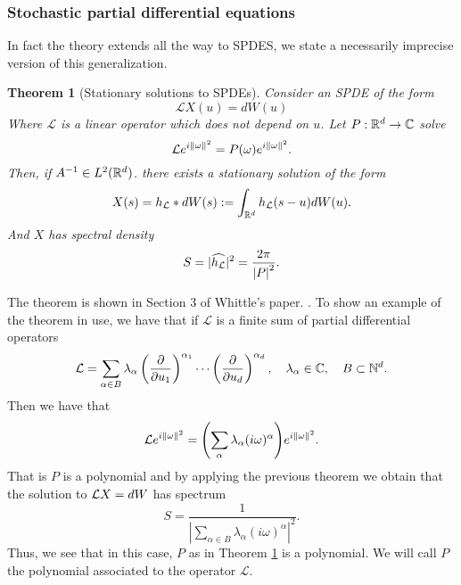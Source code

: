 \documentclass[12pt]{article}
\newtheorem{theorem}{Theorem}
\begin{document}
\subsubsection{Stochastic partial differential equations}
In fact the theory extends all the way to SPDES, we state a necessarily imprecise version of this generalization.
\begin{theorem}[Stationary solutions to SPDEs]\label{spde theorem}
	Consider an  SPDE of the form
	\begin{equation}\label{spde}
		\mathcal{L}X(u)=dW(u)
	\end{equation}
	Where $\mathcal{L}$ is a linear operator which does not depend on $u$. Let $P:{\mathbb R}^d\to\mathbb{C}$  solve
	\begin{equation*}
		\mathcal{L}e^{i\norm{\omega}^2}=P(\omega)e^{i\norm{\omega}^2}.
	\end{equation*}
	Then, if $A^{-1}\in L^2({\mathbb R}^d)$. there exists a stationary solution of the form
	\begin{equation*}
		X(s)=h_{\mathcal{L}}*dW(s):=\int_{{\mathbb R}^d} h_{\mathcal{L}}(s-u)dW(u).
	\end{equation*}
	And $X$ has spectral density
	\begin{equation*}
		S={|\widehat{h_\mathcal{L}}|^2}=\frac{2\pi}{\abs{P}^2}.
	\end{equation*}
\end{theorem}
The theorem is shown in Section $3$ of Whittle's paper. \cite{whittle1963stochastic}. To show an example of the theorem in use, we have that if $\mathcal{L}$ is a finite sum of partial differential operators
\begin{equation*}
	\mathcal{L}=\sum_{\alpha\in B} \lambda_\alpha\left(\frac{\partial}{\partial u_1}\right)^{\alpha_1}\cdots \left(\frac{\partial}{\partial u_d}\right)^{\alpha_d},\quad \lambda_{\alpha}\in\mathbb{C},\quad B\subset\mathbb{N}^d.
\end{equation*}
Then we have that
\begin{equation*}
	\mathcal{L}e^{i\norm{\omega}^2}=\qty(\sum_\alpha \lambda_\alpha(i\omega)^\alpha)e^{i\norm{\omega}^2}.
\end{equation*}
That is $P$ is a polynomial and by applying the previous theorem we obtain that the solution to $\mathcal{L} X=dW$ has spectrum
\begin{equation*}
	S=\frac{1}{|\sum_{\alpha\in B}\lambda_\alpha(i\omega)^\alpha|^2}.
\end{equation*}
Thus, we see that in this case, $P$ as in Theorem \ref{spde theorem} is a polynomial. We will call $P$ the polynomial associated to the operator $\mathcal{L}$.
\end{document}
